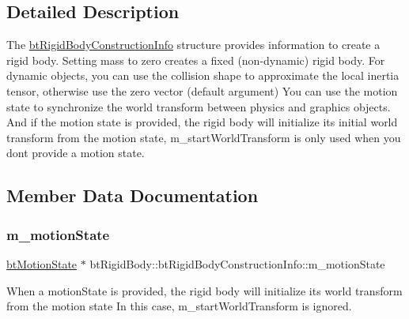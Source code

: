 \subsection{Detailed Description}
The \hyperlink{structbtRigidBody_1_1btRigidBodyConstructionInfo}{bt\+Rigid\+Body\+Construction\+Info} structure provides information to create a rigid body. Setting mass to zero creates a fixed (non-\/dynamic) rigid body. For dynamic objects, you can use the collision shape to approximate the local inertia tensor, otherwise use the zero vector (default argument) You can use the motion state to synchronize the world transform between physics and graphics objects. And if the motion state is provided, the rigid body will initialize its initial world transform from the motion state, m\+\_\+start\+World\+Transform is only used when you don\textquotesingle{}t provide a motion state. 

\subsection{Member Data Documentation}
\mbox{\label{structbtRigidBody_1_1btRigidBodyConstructionInfo_a652569f98e375430959a9961a9461e3d}} 
\subsubsection{\texorpdfstring{m\+\_\+motion\+State}{m\_motionState}}
{\footnotesize\ttfamily \hyperlink{classbtMotionState}{bt\+Motion\+State} $\ast$ bt\+Rigid\+Body\+::bt\+Rigid\+Body\+Construction\+Info\+::m\+\_\+motion\+State}

When a motion\+State is provided, the rigid body will initialize its world transform from the motion state In this case, m\+\_\+start\+World\+Transform is ignored. \mbox{\label{structbtRigidBody_1_1btRigidBodyConstructionInfo_abb72d0a00d035d2224a927810e9ed972}} 
